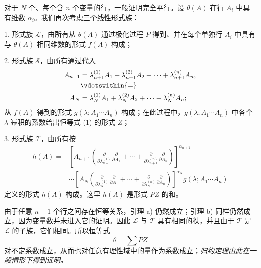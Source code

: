 对于 $N$ 个、每个含 $n$ 个变量的行，一般证明完全平行。设 $\theta(A)$ 在行 $A_i$ 中具有维数 $\alpha_i$。我们再次考虑三个线性形式族：

1. 形式族 $\mathcal L$，由所有从 $\theta(A)$ 通过极化过程 $P$ 得到、并在每个单独行 $A_i$ 中具有与 $\theta(A)$ 相同维数的形式 $f(A)$ 构成；

2. 形式族 $\mathcal S$，由所有通过代入
\[
\begin{aligned}
 A_{n+1}&=\lambda_{n+1}^{(1)}A_1+\lambda_{n+1}^{(2)}A_2+
        \cdots+\lambda_{n+1}^{(n)}A_n,\\
 &\vdotswithin{=}\\
 A_N&=\lambda_N^{(1)}A_1+\lambda_N^{(2)}A_2+
        \cdots+\lambda_N^{(n)}A_n;
\end{aligned}
\]
从 $f(A)$ 得到的形式 $g(\lambda;A_1\cdots A_n)$ 构成；在此过程中，$g(\lambda;A_1\cdots A_n)$ 中各个 $\lambda$ 幂积的系数给出恒等式 (1) 的形式 $Z$；

3. 形式族 $\mathcal T$，由所有按
\[
\begin{aligned}
 h(A)=&\left[A_{n+1}\left(
 \frac{\partial}{\partial\lambda_{n+1}^{(1)}}\frac{\partial}{\partial A_1}
 +\cdots+
 \frac{\partial}{\partial\lambda_{n+1}^{(n)}}\frac{\partial}{\partial A_n}\right)\right]^{\alpha_{n+1}} \\
&\cdots
\left[A_N\left(
 \frac{\partial}{\partial\lambda_N^{(1)}}\frac{\partial}{\partial A_1}
 +\cdots+
 \frac{\partial}{\partial\lambda_N^{(n)}}\frac{\partial}{\partial A_n}\right)\right]^{\alpha_N}
 g(\lambda;A_1\cdots A_n)
\end{aligned}
\]
定义的形式 $h(A)$ 构成。这里 $h(A)$ 是形式 $PZ$ 的和。

由于任意 $n+1$ 个行之间存在恒等关系，引理 a) 仍然成立；引理 b) 同样仍然成立，因为变量数并未进入它的证明。因此 $\mathcal L$ 与 $\mathcal T$ 具有相同的秩，并且由于 $\mathcal T$ 是 $\mathcal L$ 的子族，它们相同。所以恒等式
\[
  \theta=\sum PZ
\]
对不定系数成立，从而也对任意有理性域中的量作为系数成立；\emph{归约定理由此在一般情形下得到证明。}

